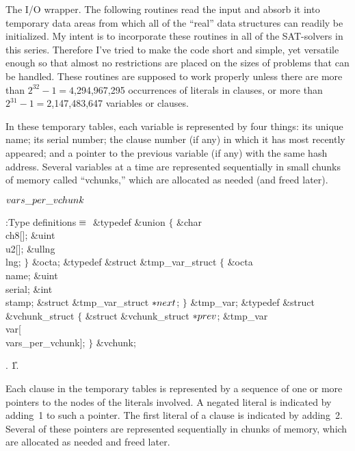 The I/O wrapper. The following routines read the input and absorb it
into
temporary data areas from which all of the ``real'' data structures
can readily be initialized. My intent is to incorporate these routines in all
of the SAT-solvers in this series. Therefore I've tried to make the code
short and simple, yet versatile enough so that almost no restrictions are
placed on the sizes of problems that can be handled. These routines are
supposed to work properly unless there are more than
$2^{32}-1=4$,294,967,295 occurrences of literals in clauses,
or more than $2^{31}-1=2$,147,483,647 variables or clauses.

In these temporary tables, each variable is represented by four things:
its unique name; its serial number; the clause number (if any) in which it has
most recently appeared; and a pointer to the previous variable (if any)
with the same hash address. Several variables at a time
are represented sequentially in small chunks of memory called ``vchunks,''
which are allocated as needed (and freed later).

\Y\B\4\D$\\{vars\_per\_vchunk}$ \5
\par
\Y\B\4:Type definitions\X${}\equiv{}$\6
\&{typedef} \&{union} ${}\{{}$\1\6
\&{char} \\{ch8}[];\6
\&{uint} \\{u2}[];\6
\&{ullng} \\{lng};\2\6
${}\}{}$ \&{octa};\6
\&{typedef} \&{struct} \&{tmp\_var\_struct} ${}\{{}$\1\6
\&{octa} \\{name};\6
\&{uint} \\{serial};\6
\&{int} \\{stamp};\6
\&{struct} \&{tmp\_var\_struct} ${}{*}\\{next}{}$;\2%
\6
${}\}{}$ \&{tmp\_var};\7
\&{typedef} \&{struct} \&{vchunk\_struct} ${}\{{}$\1\6
\&{struct} \&{vchunk\_struct} ${}{*}\\{prev}{}$;\6
\&{tmp\_var} \\{var}[\\{vars\_per\_vchunk}];\2\6
${}\}{}$ \&{vchunk};\par
{}.
\U1.\fi

Each clause in the temporary tables is represented by a sequence of
one or more pointers to the  nodes of the literals involved.
A negated literal is indicated by adding~1 to such a pointer.
The first literal of a clause is indicated by adding~2.
Several of these pointers are represented sequentially in chunks
of memory, which are allocated as needed and freed later.

